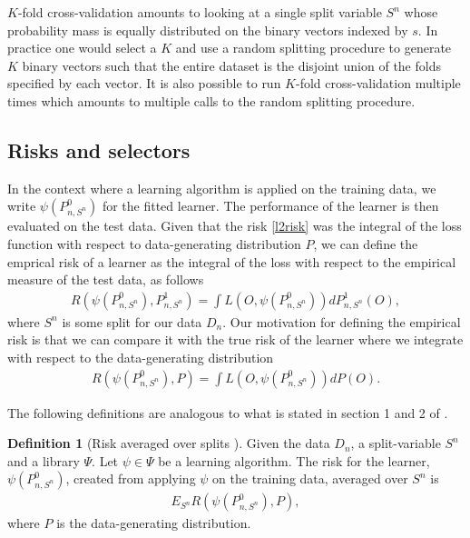 \documentclass[11pt, a4paper]{article}
\theoremstyle{definition}
\newtheorem{definition}[theorem]{Definition}
\theoremstyle{remark}
\newcommand{\la}{\psi}
\newcommand{\Sn}{S^n}
\newcommand{\lib}{\Psi}
\begin{document}
$ K $-fold cross-validation amounts to looking at a single split variable $ \Sn $ whose probability mass is equally distributed on the binary vectors indexed by $ s $. In practice one would select a $ K $ and use a random splitting procedure to generate $ K $ binary vectors such that the entire dataset is the disjoint union of the folds specified by each vector. It is also possible to run $ K $-fold cross-validation multiple times which amounts to multiple calls to the random splitting procedure.
\subsection{Risks and selectors}
In the context where a learning algorithm is applied on the training data, we write $ \la(P_{n, S^{n}}^{0}) $ for the fitted learner. The performance of the learner is then evaluated on the test data. Given that the risk \cref{l2risk} was the integral of the loss function with respect to data-generating distribution $P$, we can define the emprical risk of a learner as the integral of the loss with respect to the empirical measure of the test data, as follows
 \begin{align*}
     R(\la(P_{n, S^{n}}^{0}), P_{n, \Sn}^{1}) =  \int L(O, \la(P_{n, S^{n}}^{0})) d P_{n,\Sn}^{1}(O),
 \end{align*}
where $\Sn$ is some split for our data $D_n$. Our motivation for defining the empirical risk is that we can compare it with the true risk of the learner where we integrate with respect to the data-generating distribution 
\begin{align*}
     R(\la(P_{n, S^{n}}^{0}), P) =  \int L(O, \la(P_{n, S^{n}}^{0})) d P(O).
\end{align*}

The following definitions are analogous to what is stated in section 1 and 2 of  \parencite{laan03}.
 \begin{definition}[Risk averaged over splits \parencite{vaart06}]
     Given the data $D_n$, a split-variable $\Sn$ and a library $ \lib $. Let $ \la \in \lib $ be a learning algorithm. The risk for the learner, $\la(P_{n,\Sn}^0)$, created from applying $ \la $ on the training data, averaged over $ \Sn $ is  
    \begin{align*}
        E_{\Sn} R( \la(P_{n,\Sn}^{0}), P),
    \end{align*}
    where $ P $ is the data-generating distribution.
\end{definition}
\end{document}
